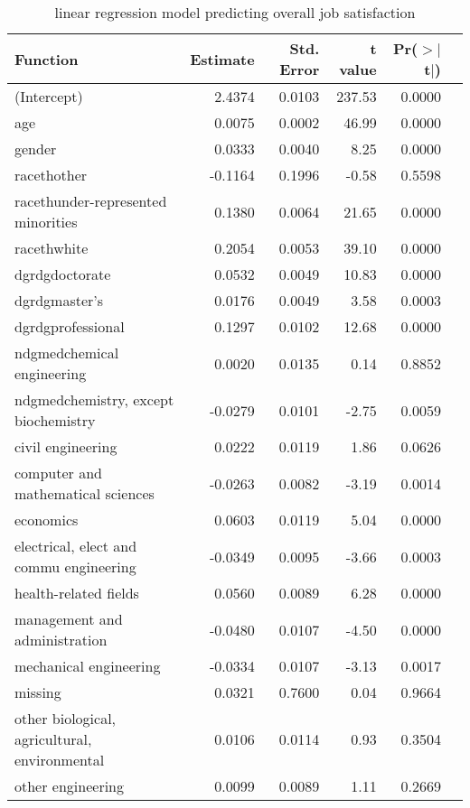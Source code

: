 \documentclass[12pt]{article}
\begin{document}
\begin{table}[H]
\centering
\caption{linear regression model predicting overall job satisfaction} 
\begin{tabular}{|l|r|r|r|r|r|}
  \hline
 \textbf{Function}  & \textbf{Estimate}  & \textbf{Std. Error}  & \textbf{t value}  & \textbf{Pr($>$$|$t$|$)}  \\ 
  \hline
(Intercept) & 2.4374 & 0.0103 & 237.53 & 0.0000 \\  \hline
  age & 0.0075 & 0.0002 & 46.99 & 0.0000 \\  \hline
  gender & 0.0333 & 0.0040 & 8.25 & 0.0000 \\  \hline
  racethother & -0.1164 & 0.1996 & -0.58 & 0.5598 \\  \hline
  racethunder-represented minorities & 0.1380 & 0.0064 & 21.65 & 0.0000 \\  \hline
  racethwhite & 0.2054 & 0.0053 & 39.10 & 0.0000 \\  \hline
  dgrdgdoctorate & 0.0532 & 0.0049 & 10.83 & 0.0000 \\  \hline
  dgrdgmaster's & 0.0176 & 0.0049 & 3.58 & 0.0003 \\  \hline
  dgrdgprofessional & 0.1297 & 0.0102 & 12.68 & 0.0000 \\  \hline
  ndgmedchemical engineering & 0.0020 & 0.0135 & 0.14 & 0.8852 \\  \hline
  ndgmedchemistry, except biochemistry & -0.0279 & 0.0101 & -2.75 & 0.0059 \\  \hline
  civil engineering & 0.0222 & 0.0119 & 1.86 & 0.0626 \\  \hline
  computer and mathematical sciences & -0.0263 & 0.0082 & -3.19 & 0.0014 \\  \hline
  economics & 0.0603 & 0.0119 & 5.04 & 0.0000 \\  \hline
  electrical, elect and commu engineering & -0.0349 & 0.0095 & -3.66 & 0.0003 \\  \hline
  health-related fields & 0.0560 & 0.0089 & 6.28 & 0.0000 \\  \hline
  management and administration & -0.0480 & 0.0107 & -4.50 & 0.0000 \\  \hline
  mechanical engineering & -0.0334 & 0.0107 & -3.13 & 0.0017 \\  \hline
  missing & 0.0321 & 0.7600 & 0.04 & 0.9664 \\  \hline
  other biological, agricultural, environmental & 0.0106 & 0.0114 & 0.93 & 0.3504 \\  \hline
  other engineering & 0.0099 & 0.0089 & 1.11 & 0.2669 \\  \hline

\end{tabular}
\end{table}
\end{document}
